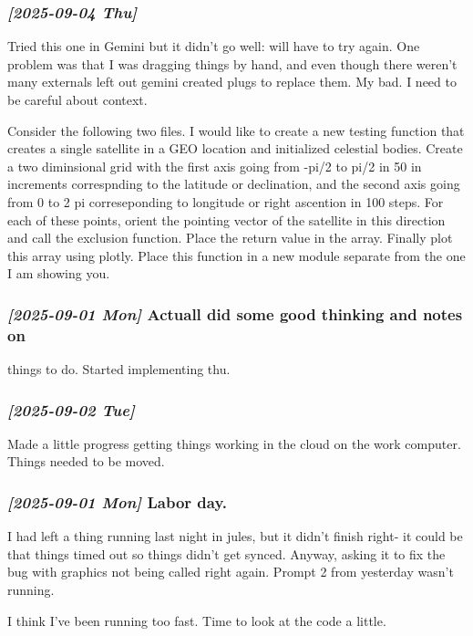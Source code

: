 \documentclass[11pt]{article}
\begin{document}
\subsubsection{\textit{[2025-09-04 Thu]}}
\label{sec:org6c41157}
Tried this one in Gemini but it didn't go well: will have to try again. One problem
was that I was dragging things by hand, and even though there weren't
many externals left out gemini created plugs to replace them.  My bad.
I need to be careful about context.


Consider the following two files. I would like to create a new testing function that
creates a single satellite in a GEO location and initialized celestial bodies.
Create a two diminsional grid with the first axis going from -pi/2 to pi/2 in 50 in increments
correspnding to the latitude or declination, and the second axis going from 0 to 2 pi correseponding
to longitude or right ascention in 100 steps. For each of these points, orient the pointing vector
of the satellite in this direction and call the exclusion function. Place the return value in the array.
Finally plot this array using plotly. Place this function in a new module separate from the one I am showing you.


\subsubsection{\textit{[2025-09-01 Mon]  }  Actuall did some good thinking and notes on}
\label{sec:org1d33f65}
things to do.  Started implementing thu.

\subsubsection{\textit{[2025-09-02 Tue]}}
\label{sec:org09a6ef2}
Made a little progress getting things working in the cloud on the
work computer.  Things needed to be moved.

\subsubsection{\textit{[2025-09-01 Mon] } Labor day.}
\label{sec:org6a27e49}
I had left a thing running last night in jules, but it didn't finish
right- it could be that things timed out so things didn't get synced.
Anyway, asking it to fix the bug with graphics not being called right
again.  Prompt 2 from yesterday wasn't running.

I think I've been running too fast. Time to look at the code a little.
\end{document}
